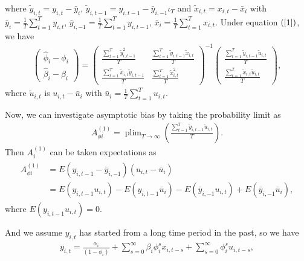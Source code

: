 \documentclass[12pt,a4paper,hyperref]{article}
\DeclareMathOperator*{\plim}{plim}
\begin{document}
where $\tilde{y}_{i,t}=y_{i,t}-\bar{y}_{i}$, $\tilde{y}_{i,t-1}=y_{i,t-1}-\bar{y}_{i,-1}\iota_{T}$ and $\tilde{x}_{i,t}=x_{i,t}-\bar{x}_{i}$ with $\bar{y}_{i}=\frac{1}{T}\sum^{T}_{t=1}y_{i,t}$, $\bar{y}_{i,-1}=\frac{1}{T}\sum^{T}_{t=1}y_{i,t-1}$,  $\bar{x}_{i}=\frac{1}{T}\sum^{T}_{t=1}x_{i,t}$.  Under equation $(\ref{1})$, we have
\begin{align}
\begin{pmatrix}
\hat{\phi}_{i}-\phi_{i} \\
\hat{\beta}_{i}-\beta_{i}
\end{pmatrix}=
\begin{pmatrix}
\frac{\sum^{T}_{t=1}\tilde{y}^{2}_{i,t-1}}{T} & \frac{\sum^{T}_{t=1}\tilde{y}_{i,t-1}\tilde{x}_{i,t}}{T} \\
\frac{\sum^{T}_{t=1}\tilde{x}_{i,t}\tilde{y}_{i,t-1}}{T} &  \frac{\sum^{T}_{t=1}\tilde{x}_{i,t}^{2}}{T}
\end{pmatrix}^{-1}
\begin{pmatrix}
\frac{\sum^{T}_{t=1}\tilde{y}_{i,t-1}\tilde{u}_{i,t}}{T} \\
\frac{\sum^{T}_{t=1}\tilde{x}_{i,t}\tilde{u}_{i,t}}{T}
\end{pmatrix},
\end{align}
where $\tilde{u}_{i,t}$ is $u_{i,t}-\bar{u}_{i}$ with $\bar{u}_{i}=\frac{1}{T}\sum^{T}_{t=1}u_{i,t}.$


Now, we can investigate asymptotic bias by taking the probability limit as
\begin{align}
A^{(1)}_{\phi i}=\plim_{T  \rightarrow \infty}\left( \frac{\sum^{T}_{t=1}\tilde{y}_{i,t-1}\tilde{u}_{i,t}}{T} \right). \label{11}
\end{align}
Then $A^{(1)}_{i}$ can be taken expectations as
\begin{align}
\begin{split}
A^{(1)}_{\phi i}&=E\left(y_{i,t-1}-\bar{y}_{i,-1} \right) \left(u_{i,t}-\bar{u}_{i} \right) \\
&= E\left( y_{i,t-1}u_{i,t}\right) - E\left( y_{i,t-1} \bar{u}_{i}  \right)-E\left(\bar{y}_{i,-1}   u_{i,t}\right)+E\left(\bar{y}_{i,-1}  \bar{u}_{i}\right),
\end{split}
\end{align}
where $E\left( y_{i,t-1}u_{i,t}\right)=0$.

And we assume $y_{i,t}$ has started from a long time period in the past, so we have
\begin{align}
y_{i,t}=\frac{\alpha_{i}}{\left(1-\phi_{i} \right)}+\sum^{\infty}_{s=0}\beta_{i}\phi^{s}_{i}x_{i,t -s}+\sum^{\infty}_{s=0}\phi^{s}_{i}u_{i,t-s},
\end{align}
\end{document}
